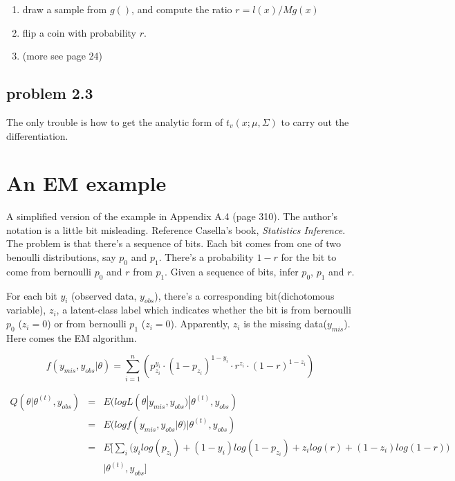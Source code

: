 \documentclass[a4paper,10pt]{article}
\begin{document}
\begin{enumerate}
\item draw a sample from $g()$, and compute the ratio $r=l(x)/Mg(x)$
\item flip a coin with probability $r$.
\item (more see page 24)
\end{enumerate}


\subsection{problem 2.3}
The only trouble is how to get the analytic form of $t_v(x; \mu, \Sigma)$ to carry out the differentiation.

\section{An EM example}
A simplified version of the example in Appendix A.4 (page 310). The author's notation is a little bit misleading. Reference Casella's book, \emph{Statistics Inference}.
The problem is that there's a sequence of bits. Each bit comes from one of two benoulli distributions, say $p_0$ and $p_1$. There's a probability $1-r$ for the bit to come from bernoulli $p_0$ and $r$ from $p_1$. Given a sequence of bits, infer $p_0$, $p_1$ and $r$.

For each bit $y_i$ (observed data, $y_{obs}$), there's a corresponding bit(dichotomous variable), $z_i$, a latent-class label which indicates whether the bit is from bernoulli $p_0$ ($z_i=0$) or from bernoulli $p_1$ ($z_i=0$). Apparently, $z_i$ is the missing data($y_{mis}$). Here comes the EM algorithm.

\begin{displaymath}
f(y_{mis}, y_{obs} | \theta) = \sum_{i=1}^n(p_{z_i}^{y_i}\cdot(1-p_{z_i})^{1-y_i} \cdot r^{z_i} \cdot (1-r)^{1-z_i})
\end{displaymath}

\begin{eqnarray*}
Q(\theta | \theta^{(t)}, y_{obs} ) & = & E(log L(\theta |y_{mis}, y_{obs}) | \theta^{(t)}, y_{obs} ) \\
& = & E(log f(y_{mis}, y_{obs} | \theta ) | \theta^{(t)}, y_{obs} ) \\
& = & E\biggl[\sum_i \biggl(y_i log(p_{z_i}) + (1-y_i)log(1-p_{z_i}) + z_i log(r) + (1-z_i)log(1-r) \biggr) \\
& & | \theta^{(t)}, y_{obs} \biggr]
\end{eqnarray*}
\end{document}
